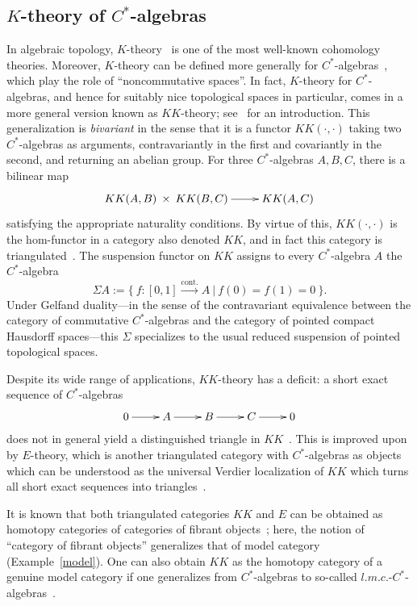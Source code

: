 \documentclass{amsproc}
\theoremstyle{definition}
\begin{document}
\subsection{$K$-theory of $C^*$-algebras}

In algebraic topology, $K$-theory~\cite{HatcherK} is one of the most well-known cohomology theories. Moreover, $K$-theory can be defined more generally for $C^*$-algebras~\cite{RLL}, which play the role of ``noncommutative spaces''. In fact, $K$-theory for $C^*$-algebras, and hence for suitably nice topological spaces in particular, comes in a more general version known as $KK$-theory; see~\cite{Higson,Blackadar} for an introduction. This generalization is \emph{bivariant} in the sense that it is a functor $KK(\cdot,\cdot)$ taking two $C^*$-algebras as arguments, contravariantly in the first and covariantly in the second, and returning an abelian group. For three $C^*$-algebras $A,B,C$, there is a bilinear map
\[
\xymatrix{ KK(A,B) \:\times\: KK(B,C) \ar[r] & KK(A,C) }
\]
satisfying the appropriate naturality conditions. By virtue of this, $KK(\cdot,\cdot)$ is the hom-functor in a category also denoted $KK$, and in fact this category is triangulated~\cite{Meyer}. The suspension functor on $KK$ assigns to every $C^*$-algebra $A$ the $C^*$-algebra
\[
\Sigma A := \{ \: f : [0,1] \stackrel{\mathrm{cont.}}{\longrightarrow} A \:|\: f(0)=f(1)=0 \:\}.
\]
Under Gelfand duality---in the sense of the contravariant equivalence between the category of commutative $C^*$-algebras and the category of pointed compact Hausdorff spaces---this $\Sigma$ specializes to the usual reduced suspension of pointed topological spaces.

Despite its wide range of applications, $KK$-theory has a deficit: a short exact sequence of $C^*$-algebras
\[
\xymatrix{ 0 \ar[r] & A \ar[r] & B \ar[r] & C \ar[r] & 0 }
\]
does not in general yield a distinguished triangle in $KK$~\cite{Skandalis}. This is improved upon by $E$-theory, which is another triangulated category with $C^*$-algebras as objects which can be understood as the universal Verdier localization of $KK$ which turns all short exact sequences into triangles~\cite{Hig}.

It is known that both triangulated categories $KK$ and $E$ can be obtained as homotopy categories of categories of fibrant objects~\cite{Uuye}; here, the notion of ``category of fibrant objects'' generalizes that of model category (Example~\ref{model}). One can also obtain $KK$ as the homotopy category of a genuine model category if one generalizes from $C^*$-algebras to so-called $l.m.c.$-$C^*$-algebras~\cite{JJ}.
\end{document}
